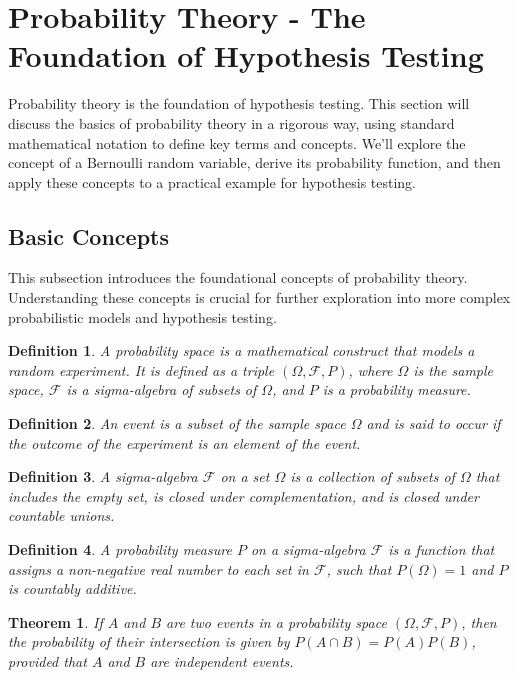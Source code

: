 \documentclass[a4paper,12pt]{book}
\newcounter{example}
\newtheorem{theorem}{Theorem}
\newtheorem{definition}{Definition}
\begin{document}
\section{Probability Theory - The Foundation of Hypothesis Testing}
Probability theory is the foundation of hypothesis testing. This section will discuss the basics of probability theory in a rigorous way, using standard mathematical notation to define key terms and concepts. We'll explore the concept of a Bernoulli random variable, derive its probability function, and then apply these concepts to a practical example for hypothesis testing.

\subsection{Basic Concepts}
This subsection introduces the foundational concepts of probability theory. Understanding these concepts is crucial for further exploration into more complex probabilistic models and hypothesis testing.

\begin{definition}
A \textit{probability space} is a mathematical construct that models a random experiment. It is defined as a triple $(\Omega, \mathcal{F}, P)$, where $\Omega$ is the sample space, $\mathcal{F}$ is a sigma-algebra of subsets of $\Omega$, and $P$ is a probability measure.
\end{definition}

\begin{definition}
An \textit{event} is a subset of the sample space $\Omega$ and is said to occur if the outcome of the experiment is an element of the event.
\end{definition}

\begin{definition}
A \textit{sigma-algebra} $\mathcal{F}$ on a set $\Omega$ is a collection of subsets of $\Omega$ that includes the empty set, is closed under complementation, and is closed under countable unions.
\end{definition}

\begin{definition}
A \textit{probability measure} $P$ on a sigma-algebra $\mathcal{F}$ is a function that assigns a non-negative real number to each set in $\mathcal{F}$, such that $P(\Omega) = 1$ and $P$ is countably additive.
\end{definition}

\begin{theorem}
If $A$ and $B$ are two events in a probability space $(\Omega, \mathcal{F}, P)$, then the probability of their intersection is given by $P(A \cap B) = P(A)P(B)$, provided that $A$ and $B$ are independent events.
\end{theorem}
\end{document}
